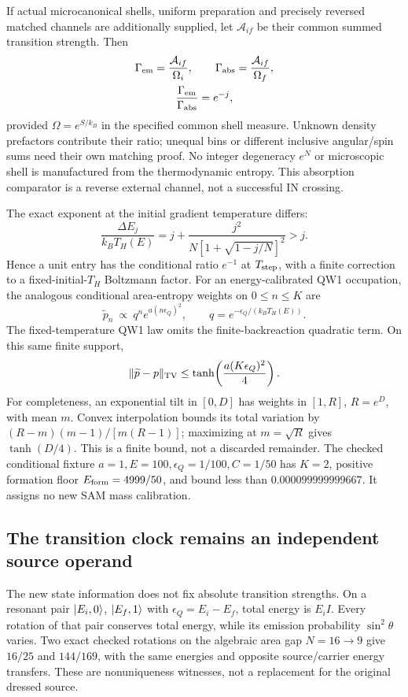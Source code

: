 \documentclass[10pt,twocolumn,letterpaper]{article}
\begin{document}
If actual microcanonical shells, uniform preparation and precisely
reversed matched channels are additionally supplied, let $\mathcal A_{if}$
be their common summed transition strength. Then
\begin{equation}
 \begin{gathered}
 \Gamma_{\rm em}=\frac{\mathcal A_{if}}{\Omega_i},\qquad
 \Gamma_{\rm abs}=\frac{\mathcal A_{if}}{\Omega_f},\\
 \frac{\Gamma_{\rm em}}{\Gamma_{\rm abs}}=e^{-j},
 \end{gathered}
\end{equation}
provided $\Omega=e^{S/k_B}$ in the specified common shell measure.
Unknown density prefactors contribute their ratio; unequal bins or
different inclusive angular/spin sums need their own matching proof.
No integer degeneracy $e^N$ or microscopic shell is manufactured from
the thermodynamic entropy. This absorption comparator is a reverse
external channel, not a successful IN crossing.

The exact exponent at the initial gradient temperature differs:
\begin{equation}
 \frac{\Delta E_j}{k_BT_H(E)}
 =j+\frac{j^2}{N[1+\sqrt{1-j/N}]^2}>j .
\end{equation}
Hence a unit entry has the conditional ratio $e^{-1}$ at $T_{\rm step}$,
with a finite correction to a fixed-initial-$T_H$ Boltzmann factor.
For an energy-calibrated QW1 occupation, the analogous conditional
area-entropy weights on $0\le n\le K$ are
\begin{equation}
 \widetilde p_n\ \propto\ q^n e^{a(n\epsilon_Q)^2},\qquad
 q=e^{-\epsilon_Q/(k_BT_H(E))}.
\end{equation}
The fixed-temperature QW1 law omits the finite-backreaction
quadratic term. On this same finite support,
\begin{equation}
 \|\widetilde p-p\|_{\rm TV}
       \le\tanh\!\left(\frac{a(K\epsilon_Q)^2}{4}\right).
\end{equation}
For completeness, an exponential tilt in $[0,D]$ has weights in
$[1,R]$, $R=e^D$, with mean $m$. Convex interpolation bounds its total
variation by $(R-m)(m-1)/[m(R-1)]$; maximizing at $m=\sqrt R$ gives
$\tanh(D/4)$. This is a finite bound, not a discarded remainder.
The checked conditional fixture $a=1,E=100,\epsilon_Q=1/100,C=1/50$
has $K=2$, positive formation floor $E_{\rm form}=4999/50$, and bound
less than $0.000099999999667$. It assigns no new SAM mass calibration.

\subsection{The transition clock remains an independent source operand}
The new state information does not fix absolute transition strengths.
On a resonant pair $\ket{E_i,0}$, $\ket{E_f,1}$ with
$\epsilon_Q=E_i-E_f$, total energy is $E_i I$. Every rotation of that
pair conserves total energy, while its emission probability
$\sin^2\theta$ varies. Two exact checked rotations on the algebraic area
gap $N=16\to9$ give $16/25$ and $144/169$, with the same energies and
opposite source/carrier energy transfers. These are nonuniqueness
witnesses, not a replacement for the original dressed source.
\end{document}
